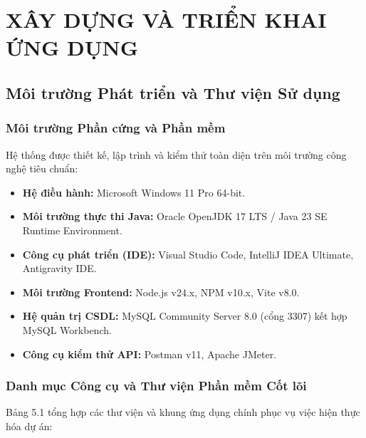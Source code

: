 \documentclass{uetgraduation}
\begin{document}
\chapter{XÂY DỰNG VÀ TRIỂN KHAI ỨNG DỤNG}

\section{Môi trường Phát triển và Thư viện Sử dụng}
\subsection{Môi trường Phần cứng và Phần mềm}
Hệ thống được thiết kế, lập trình và kiểm thử toàn diện trên môi trường công nghệ tiêu chuẩn:
\begin{itemize}
    \item \textbf{Hệ điều hành:} Microsoft Windows 11 Pro 64-bit.
    \item \textbf{Môi trường thực thi Java:} Oracle OpenJDK 17 LTS / Java 23 SE Runtime Environment.
    \item \textbf{Công cụ phát triển (IDE):} Visual Studio Code, IntelliJ IDEA Ultimate, Antigravity IDE.
    \item \textbf{Môi trường Frontend:} Node.js v24.x, NPM v10.x, Vite v8.0.
    \item \textbf{Hệ quản trị CSDL:} MySQL Community Server 8.0 (cổng 3307) kết hợp MySQL Workbench.
    \item \textbf{Công cụ kiểm thử API:} Postman v11, Apache JMeter.
\end{itemize}

\subsection{Danh mục Công cụ và Thư viện Phần mềm Cốt lõi}
Bảng 5.1 tổng hợp các thư viện và khung ứng dụng chính phục vụ việc hiện thực hóa dự án:
\end{document}
